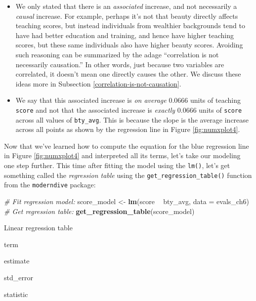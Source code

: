 \documentclass[12pt,]{krantz}
\makeatletter
\newenvironment{Shaded}{\begin{snugshade}}{\end{snugshade}}
\newcommand{\KeywordTok}[1]{\textcolor[rgb]{0.27,0.27,0.27}{\textbf{#1}}}
\newcommand{\DataTypeTok}[1]{\textcolor[rgb]{0.27,0.27,0.27}{#1}}
\newcommand{\StringTok}[1]{\textcolor[rgb]{0.5,0.5,0.5}{#1}}
\newcommand{\CommentTok}[1]{\textcolor[rgb]{0.37,0.37,0.37}{\textit{#1}}}
\newcommand{\OperatorTok}[1]{\textcolor[rgb]{0.43,0.43,0.43}{\textbf{#1}}}
\newcommand{\NormalTok}[1]{#1}
\providecommand{\tightlist}{%
  \setlength{\itemsep}{0pt}\setlength{\parskip}{0pt}}
\newenvironment{kframe}{%
\medskip{}
\setlength{\fboxsep}{.8em}
 \def\at@end@of@kframe{}%
 \ifinner\ifhmode%
  \def\at@end@of@kframe{\end{minipage}}%
  \begin{minipage}{\columnwidth}%
 \fi\fi%
 \def\FrameCommand##1{\hskip\@totalleftmargin \hskip-\fboxsep
 \colorbox{shadecolor}{##1}\hskip-\fboxsep
     \hskip-\linewidth \hskip-\@totalleftmargin \hskip\columnwidth}%
 \MakeFramed {\advance\hsize-\width
   \@totalleftmargin\z@ \linewidth\hsize
   \@setminipage}}%
 {\par\unskip\endMakeFramed%
 \at@end@of@kframe}
\renewenvironment{Shaded}{\begin{kframe}}{\end{kframe}}
\makeatother
\begin{document}
\begin{itemize}
\tightlist
\item
  We only stated that there is an \emph{associated} increase, and not
  necessarily a \emph{causal} increase. For example, perhaps it's not
  that beauty directly affects teaching scores, but instead individuals
  from wealthier backgrounds tend to have had better education and
  training, and hence have higher teaching scores, but these same
  individuals also have higher beauty scores. Avoiding such reasoning
  can be summarized by the adage ``correlation is not necessarily
  causation.'' In other words, just because two variables are
  correlated, it doesn't mean one directly causes the other. We discuss
  these ideas more in Subsection \ref{correlation-is-not-causation}.\\
\item
  We say that this associated increase is \emph{on average} 0.0666 units
  of teaching \texttt{score} and not that the associated increase is
  \emph{exactly} 0.0666 units of \texttt{score} across all values of
  \texttt{bty\_avg}. This is because the slope is the average increase
  across all points as shown by the regression line in Figure
  \ref{fig:numxplot4}.
\end{itemize}

Now that we've learned how to compute the equation for the blue
regression line in Figure \ref{fig:numxplot4} and interpreted all its
terms, let's take our modeling one step further. This time after fitting
the model using the \texttt{lm()}, let's get something called the
\emph{regression table} using the \texttt{get\_regression\_table()}
function from the \texttt{moderndive} package:

\begin{Shaded}
\begin{Highlighting}[]
\CommentTok{# Fit regression model:}
\NormalTok{score_model <-}\StringTok{ }\KeywordTok{lm}\NormalTok{(score }\OperatorTok{~}\StringTok{ }\NormalTok{bty_avg, }\DataTypeTok{data =}\NormalTok{ evals_ch6)}
\CommentTok{# Get regression table:}
\KeywordTok{get_regression_table}\NormalTok{(score_model)}
\end{Highlighting}
\end{Shaded}

\label{tab:numxplot4b}Linear regression table

term

estimate

std\_error

statistic
\end{document}
